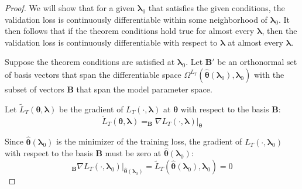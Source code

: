 \documentclass[12pt,letterpaper]{article}
\begin{document}
\begin{proof}
We will show that for a given $\boldsymbol \lambda_0$ that satisfies the given conditions, the validation loss is continuously differentiable within some neighborhood of $\boldsymbol \lambda_0$.  It then follows that if the theorem conditions hold true for almost every $\boldsymbol \lambda$, then the validation loss is continuously differentiable with respect to $\boldsymbol \lambda$ at almost every $\boldsymbol \lambda$.

Suppose the theorem conditions are satisfied at $\boldsymbol \lambda_0$. Let $\boldsymbol B'$ be an orthonormal set of basis vectors that span the differentiable space $\Omega^{L_T}(\hat {\boldsymbol \theta}(\boldsymbol \lambda_0), \boldsymbol \lambda_0)$ with the subset of vectors $\boldsymbol B$ that span the model parameter space.

Let $\tilde L_T(\boldsymbol \theta,\boldsymbol \lambda)$ be the gradient of $L_T(\cdot, \boldsymbol \lambda)$ at $\boldsymbol \theta$ with respect to the basis $\boldsymbol B$:
\begin{equation}
\tilde L_T(\boldsymbol \theta,\boldsymbol \lambda) = _{\boldsymbol B}\nabla L_T(\cdot, \boldsymbol \lambda) |_{\boldsymbol \theta}
\end{equation}

Since $\hat {\boldsymbol \theta}(\boldsymbol \lambda_0)$ is the minimizer of the training loss, the gradient of $L_T(\cdot, \boldsymbol \lambda_0)$ with respect to the basis $\boldsymbol B$ must be zero at $\hat {\boldsymbol \theta}(\boldsymbol \lambda_0)$:
\begin{equation}
_{\boldsymbol B}\nabla L_T(\cdot, \boldsymbol \lambda_0)|_{\hat {\boldsymbol \theta}(\boldsymbol \lambda_0)} = \tilde L_T(\hat {\boldsymbol \theta}(\boldsymbol \lambda_0), \boldsymbol \lambda_0) = 0
\end{equation}


\end{proof}
\end{document}
